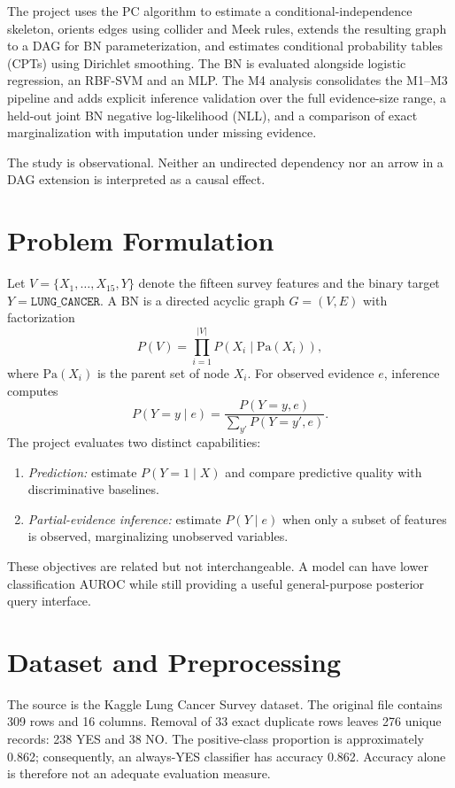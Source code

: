 \documentclass[conference]{IEEEtran}
\begin{document}
The project uses the PC algorithm to estimate a conditional-independence skeleton, orients edges using collider and Meek rules, extends the resulting graph to a DAG for BN parameterization, and estimates conditional probability tables (CPTs) using Dirichlet smoothing. The BN is evaluated alongside logistic regression, an RBF-SVM and an MLP. The M4 analysis consolidates the M1--M3 pipeline and adds explicit inference validation over the full evidence-size range, a held-out joint BN negative log-likelihood (NLL), and a comparison of exact marginalization with imputation under missing evidence.

The study is observational. Neither an undirected dependency nor an arrow in a DAG extension is interpreted as a causal effect.

\section{Problem Formulation}
Let $V=\{X_1,\ldots,X_{15},Y\}$ denote the fifteen survey features and the binary target $Y=\texttt{LUNG\_CANCER}$. A BN is a directed acyclic graph $G=(V,E)$ with factorization
\begin{equation}
P(V)=\prod_{i=1}^{|V|}P(X_i\mid \mathrm{Pa}(X_i)),
\end{equation}
where $\mathrm{Pa}(X_i)$ is the parent set of node $X_i$. For observed evidence $e$, inference computes
\begin{equation}
P(Y=y\mid e)=\frac{P(Y=y,e)}{\sum_{y'}P(Y=y',e)}.
\end{equation}
The project evaluates two distinct capabilities:
\begin{enumerate}
\item \textit{Prediction:} estimate $P(Y=1\mid X)$ and compare predictive quality with discriminative baselines.
\item \textit{Partial-evidence inference:} estimate $P(Y\mid e)$ when only a subset of features is observed, marginalizing unobserved variables.
\end{enumerate}
These objectives are related but not interchangeable. A model can have lower classification AUROC while still providing a useful general-purpose posterior query interface.

\section{Dataset and Preprocessing}
The source is the Kaggle Lung Cancer Survey dataset. The original file contains 309 rows and 16 columns. Removal of 33 exact duplicate rows leaves 276 unique records: 238 YES and 38 NO. The positive-class proportion is approximately 0.862; consequently, an always-YES classifier has accuracy 0.862. Accuracy alone is therefore not an adequate evaluation measure.
\end{document}
